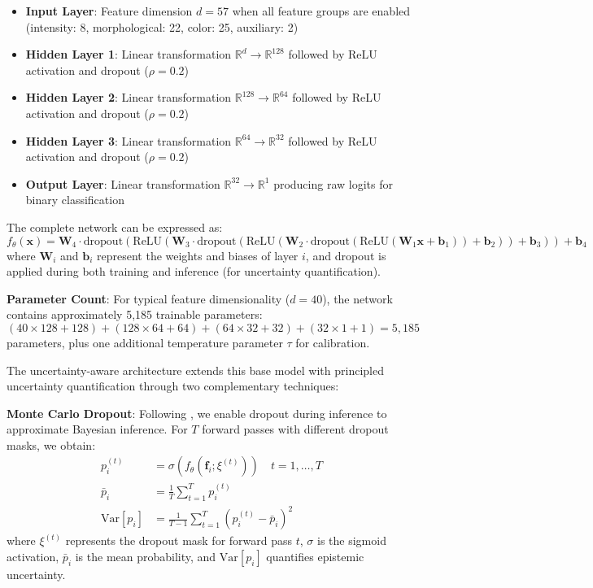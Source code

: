 \documentclass[twocolumn,10pt]{aastex631}
\begin{document}
\begin{itemize}
\item \textbf{Input Layer}: Feature dimension $d = 57$ when all feature groups are enabled (intensity: 8, morphological: 22, color: 25, auxiliary: 2)
\item \textbf{Hidden Layer 1}: Linear transformation $\mathbb{R}^{d} \rightarrow \mathbb{R}^{128}$ followed by ReLU activation and dropout ($\rho = 0.2$)
\item \textbf{Hidden Layer 2}: Linear transformation $\mathbb{R}^{128} \rightarrow \mathbb{R}^{64}$ followed by ReLU activation and dropout ($\rho = 0.2$)
\item \textbf{Hidden Layer 3}: Linear transformation $\mathbb{R}^{64} \rightarrow \mathbb{R}^{32}$ followed by ReLU activation and dropout ($\rho = 0.2$)
\item \textbf{Output Layer}: Linear transformation $\mathbb{R}^{32} \rightarrow \mathbb{R}^{1}$ producing raw logits for binary classification
\end{itemize}

The complete network can be expressed as:
\begin{equation}
f_{\theta}(\mathbf{x}) = \mathbf{W}_4 \cdot \text{dropout}(\text{ReLU}(\mathbf{W}_3 \cdot \text{dropout}(\text{ReLU}(\mathbf{W}_2 \cdot \text{dropout}(\text{ReLU}(\mathbf{W}_1 \mathbf{x} + \mathbf{b}_1)) + \mathbf{b}_2)) + \mathbf{b}_3)) + \mathbf{b}_4
\end{equation}
where $\mathbf{W}_i$ and $\mathbf{b}_i$ represent the weights and biases of layer $i$, and dropout is applied during both training and inference (for uncertainty quantification).

\textbf{Parameter Count}: For typical feature dimensionality ($d = 40$), the network contains approximately 5,185 trainable parameters: $(40 \times 128 + 128) + (128 \times 64 + 64) + (64 \times 32 + 32) + (32 \times 1 + 1) = 5,185$ parameters, plus one additional temperature parameter $\tau$ for calibration.

The uncertainty-aware architecture extends this base model with principled uncertainty quantification through two complementary techniques:

\textbf{Monte Carlo Dropout}: Following \citet{Gal2016MCDropout}, we enable dropout during inference to approximate Bayesian inference. For $T$ forward passes with different dropout masks, we obtain:
\begin{align}
p_i^{(t)} &= \sigma(f_{\theta}(\mathbf{f}_i; \xi^{(t)})) \quad t = 1, \ldots, T \\
\bar{p}_i &= \frac{1}{T} \sum_{t=1}^T p_i^{(t)} \\
\text{Var}[p_i] &= \frac{1}{T-1} \sum_{t=1}^T (p_i^{(t)} - \bar{p}_i)^2
\end{align}
where $\xi^{(t)}$ represents the dropout mask for forward pass $t$, $\sigma$ is the sigmoid activation, $\bar{p}_i$ is the mean probability, and $\text{Var}[p_i]$ quantifies epistemic uncertainty.
\end{document}
